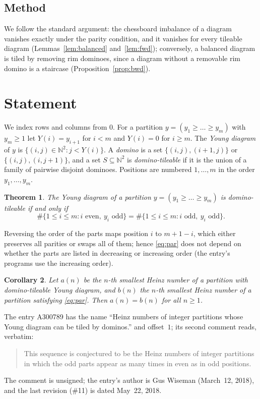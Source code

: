 \documentclass[11pt]{amsart}
\theoremstyle{plain}
\newtheorem{theorem}{Theorem}
\newtheorem{corollary}[theorem]{Corollary}
\theoremstyle{definition}
\newcommand{\N}{\mathbb{N}}
\begin{document}
\subsection*{Method}
We follow the standard argument: the chessboard imbalance of a diagram vanishes exactly under the parity condition, and it vanishes for every tileable diagram (Lemmas~\ref{lem:balanced} and~\ref{lem:fwd}); conversely, a balanced diagram is tiled by removing rim dominoes, since a diagram without a removable rim domino is a staircase (Proposition~\ref{prop:bwd}).

\section{Statement}\label{sec:statement}

We index rows and columns from $0$. For a partition $y=(y_1\ge\dots\ge y_m)$ with $y_m\ge1$ let $Y(i)=y_{i+1}$ for $i<m$ and $Y(i)=0$ for $i\ge m$. The \emph{Young diagram} of $y$ is $\{(i,j)\in\N^2: j<Y(i)\}$. A \emph{domino} is a set $\{(i,j),(i+1,j)\}$ or $\{(i,j),(i,j+1)\}$, and a set $S\subseteq\N^2$ is \emph{domino-tileable} if it is the union of a family of pairwise disjoint dominoes. Positions are numbered $1,\dots,m$ in the order $y_1,\dots,y_m$.

\begin{theorem}\label{thm:main}
The Young diagram of a partition $y=(y_1\ge\dots\ge y_m)$ is domino-tileable if and only if
\begin{equation}\label{eq:par}
\#\{1\le i\le m: i\text{ even},\ y_i\text{ odd}\}=\#\{1\le i\le m: i\text{ odd},\ y_i\text{ odd}\}.
\end{equation}
\end{theorem}

Reversing the order of the parts maps position $i$ to $m+1-i$, which either preserves all parities or swaps all of them; hence \eqref{eq:par} does not depend on whether the parts are listed in decreasing or increasing order (the entry's programs use the increasing order).

\begin{corollary}\label{cor:seq}
Let $a(n)$ be the $n$-th smallest Heinz number of a partition with domino-tileable Young diagram, and $b(n)$ the $n$-th smallest Heinz number of a partition satisfying \eqref{eq:par}. Then $a(n)=b(n)$ for all $n\ge1$.
\end{corollary}

The entry A300789 \cite{A300789} has the name ``Heinz numbers of integer partitions whose Young diagram can be tiled by dominos.'' and offset~$1$; its second comment reads, verbatim:
\begin{quote}
This sequence is conjectured to be the Heinz numbers of integer partitions in which the odd parts appear as many times in even as in odd positions.
\end{quote}
The comment is unsigned; the entry's author is Gus Wiseman (March~12, 2018), and the last revision (\#11) is dated May~22, 2018.
\end{document}
